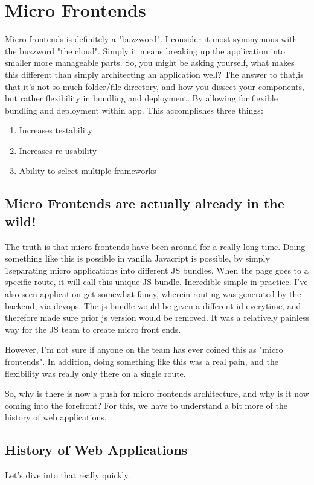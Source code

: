 \chapter{ Micro Frontends }
Micro frontends is definitely a "buzzword". I consider it most synonymous with the buzzword "the cloud". Simply it means breaking up the application into smaller more manageable parts. So, you might be asking yourself, what makes this different than simply architecting an application well? The answer to that,is that it's not so much folder/file directory, and how you dissect your components, but rather flexibility in bundling and deployment. By allowing for flexible bundling and deployment within app. This accomplishes three things: 
\begin{enumerate}
  \item Increases testability
  \item Increases re-usability
  \item Ability to select multiple frameworks
\end{enumerate}

\section{Micro Frontends are actually already in the wild!}

The truth is that micro-frontends have been around for a really long time. Doing something like this is possible in vanilla Javacript is possible, by simply 1separating micro applications into different JS bundles. When the page goes to a specific route, it will call this unique JS bundle. Incredible simple in practice. I've also seen application get somewhat fancy, wherein routing was generated by the backend, via devops. The js bundle would be given a different id everytime, and therefore made sure prior js version would be removed. It was a relatively painless way for the JS team to create micro front ends. 

However, I'm not sure if anyone on the team has ever coined this as "micro frontends". In addition, doing something like this was a real pain, and the flexibility was really only there on a single route. 

So, why is there is now a push for micro frontends architecture, and why is it now coming into the forefront? For this, we have to understand a bit more of the history of web applications.

\section{History of Web Applications}
Let's dive into that really quickly.

